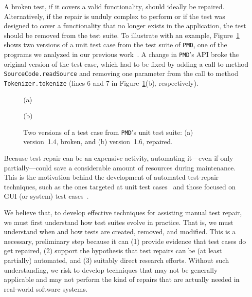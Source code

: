 \documentclass[conference]{IEEEtran}
\newcommand{\lang}[1]{\texttt{\small #1}}
\newcommand{\subject}[1]{\texttt{\small #1}}
\begin{document}
A broken test, if it covers a valid functionality, should ideally be
repaired. Alternatively, if the repair is unduly complex to perform or
if the test was designed to cover a functionality that no longer
exists in the application, the test should be removed from the test
suite. To illustrate with an example,
Figure~\ref{fig:pmd-javatokenizertest} shows two versions of a unit
test case from the test suite of \subject{PMD}, one of the programs we
analyzed in our previous work~\cite{pinto12}. A change in
\subject{PMD}'s API broke the original version of the test case, which
had to be fixed by adding a call to method
\lang{SourceCode.readSource} and removing one parameter from the call
to method \lang{Tokenizer.tokenize} (lines 6 and 7 in
Figure~\ref{fig:pmd-javatokenizertest}(b), respectively).

\begin{figure}[t]

\vspace*{-4pt}
\centerline{(a)}

\vspace*{-4pt}
\centerline{(b)}
\vspace*{-8pt}
\caption{Two versions of a test case from \subject{PMD}'s unit test
  suite: (a) version~1.4, broken, and (b) version~1.6, repaired.}
\vspace*{-12pt}
\label{fig:pmd-javatokenizertest}
\end{figure}

Because test repair can be an expensive activity, automating it---even
if only partially---could save a considerable amount of resources
during maintenance. This is the motivation behind the development of
automated test-repair techniques, such as the ones targeted at unit
test cases~\cite{Daniel:2009, Daniel:2010, Mirzaaghaei:2012} and those
focused on GUI (or system) test cases~\cite{Choudhary:2011,
  Grechanik:2009, Huang:2010, Memon:2008}.

We believe that, to develop effective techniques for assisting manual
test repair, we must first understand how test suites evolve in
practice. That is, we must understand when and how tests are created,
removed, and modified. This is a necessary, preliminary step because
it can (1) provide evidence that test cases do get repaired, (2)
support the hypothesis that test repairs can be (at least partially)
automated, and (3) suitably direct research efforts.  Without such
understanding, we risk to develop techniques that may not be generally
applicable and may not perform the kind of repairs that are actually
needed in real-world software systems.
\end{document}
